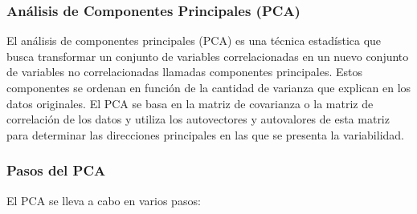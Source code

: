 \documentclass{article}
\begin{document}
\subsubsection{Análisis de Componentes Principales (PCA)}
El análisis de componentes principales (PCA) es una técnica estadística que busca transformar un conjunto de variables correlacionadas en un nuevo conjunto de variables no correlacionadas llamadas componentes principales. Estos componentes se ordenan en función de la cantidad de varianza que explican en los datos originales. El PCA se basa en la matriz de covarianza o la matriz de correlación de los datos y utiliza los autovectores y autovalores de esta matriz para determinar las direcciones principales en las que se presenta la variabilidad.

\subsubsection{Pasos del PCA}
El PCA se lleva a cabo en varios pasos:
\end{document}
